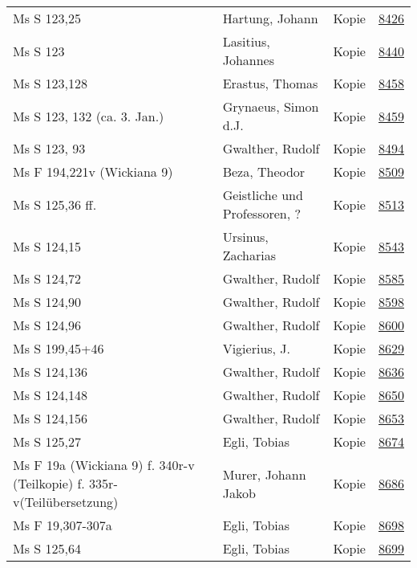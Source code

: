 \documentclass[10pt,a4paper,landscape]{report}
\begin{document}
\begin{longtable}{p{16cm}p{4cm}lr}
Ms S 123,25	&	Hartung, Johann	&	Kopie	&	\href{http://130.60.24.72/assignment/8426}{8426}\\
Ms S 123	&	Lasitius, Johannes	&	Kopie	&	\href{http://130.60.24.72/assignment/8440}{8440}\\
Ms S 123,128	&	Erastus, Thomas	&	Kopie	&	\href{http://130.60.24.72/assignment/8458}{8458}\\
Ms S 123, 132 (ca. 3. Jan.)	&	Grynaeus, Simon d.J.	&	Kopie	&	\href{http://130.60.24.72/assignment/8459}{8459}\\
Ms S 123, 93	&	Gwalther, Rudolf	&	Kopie	&	\href{http://130.60.24.72/assignment/8494}{8494}\\
Ms F 194,221v (Wickiana 9)	&	Beza, Theodor	&	Kopie	&	\href{http://130.60.24.72/assignment/8509}{8509}\\
Ms S 125,36 ff.	&	Geistliche und Professoren, ?	&	Kopie	&	\href{http://130.60.24.72/assignment/8513}{8513}\\
Ms S 124,15	&	Ursinus, Zacharias	&	Kopie	&	\href{http://130.60.24.72/assignment/8543}{8543}\\
Ms S 124,72	&	Gwalther, Rudolf	&	Kopie	&	\href{http://130.60.24.72/assignment/8585}{8585}\\
Ms S 124,90	&	Gwalther, Rudolf	&	Kopie	&	\href{http://130.60.24.72/assignment/8598}{8598}\\
Ms S 124,96	&	Gwalther, Rudolf	&	Kopie	&	\href{http://130.60.24.72/assignment/8600}{8600}\\
Ms S 199,45+46	&	Vigierius, J.	&	Kopie	&	\href{http://130.60.24.72/assignment/8629}{8629}\\
Ms S 124,136	&	Gwalther, Rudolf	&	Kopie	&	\href{http://130.60.24.72/assignment/8636}{8636}\\
Ms S 124,148	&	Gwalther, Rudolf	&	Kopie	&	\href{http://130.60.24.72/assignment/8650}{8650}\\
Ms S 124,156	&	Gwalther, Rudolf	&	Kopie	&	\href{http://130.60.24.72/assignment/8653}{8653}\\
Ms S 125,27	&	Egli, Tobias	&	Kopie	&	\href{http://130.60.24.72/assignment/8674}{8674}\\
Ms F 19a (Wickiana 9) f. 340r-v (Teilkopie) f. 335r-v(Teilübersetzung)	&	Murer, Johann Jakob	&	Kopie	&	\href{http://130.60.24.72/assignment/8686}{8686}\\
Ms F 19,307-307a	&	Egli, Tobias	&	Kopie	&	\href{http://130.60.24.72/assignment/8698}{8698}\\
Ms S 125,64	&	Egli, Tobias	&	Kopie	&	\href{http://130.60.24.72/assignment/8699}{8699}\\

\end{longtable}
\end{document}
